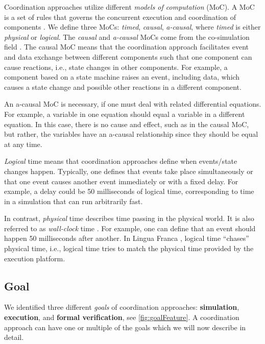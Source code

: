 \documentclass[runningheads]{llncs}
\begin{document}
Coordination approaches utilize different \textit{models of computation} (MoC).
A MoC is a set of rules that governs the concurrent execution and coordination of components \cite{ptolemaeusSystemDesignModeling2014}.
We define three MoCs: \textit{timed}, \textit{causal}, \textit{a-causal}, where \textit{timed} is either \textit{physical} or \textit{logical}.
The \textit{causal} and \textit{a-causal} MoCs come from the co-simulation field \cite{gomesCoSimulationSurvey2019}.
The causal MoC means that the coordination approach facilitates event and data exchange between different components such that one component can cause reactions, i.e., state changes in other components.
For example, a component based on a state machine raises an event, including data, which causes a state change and possible other reactions in a different component.

An a-causal MoC is necessary, if one must deal with related differential equations.
For example, a variable in one equation should equal a variable in a different equation.
In this case, there is no cause and effect, such as in the causal MoC, but rather, the variables have an a-causal relationship since they should be equal at any time.

\textit{Logical} time means that coordination approaches define when events/state changes happen.
Typically, one defines that events take place simultaneously or that one event causes another event immediately or with a fixed delay.
For example, a delay could be 50 milliseconds of logical time, corresponding to time in a simulation that can run arbitrarily fast.

In contrast, \textit{physical} time describes time passing in the physical world.
It is also referred to as \textit{wall-clock} time \cite{gomesCoSimulationSurvey2019}.
For example, one can define that an event should happen 50 milliseconds after another.
In Lingua Franca \cite{lohstrohReactorsDeterministicModel2020}, logical time ``chases'' physical time, i.e., logical time tries to match the physical time provided by the execution platform.


\subsection{Goal} %
We identified three different \textit{goals} of coordination approaches: \textbf{simulation}, \textbf{execution}, and \textbf{formal verification}, see \autoref{fig:goalFeature}.
A coordination approach can have one or multiple of the goals which we will now describe in detail.
\end{document}
